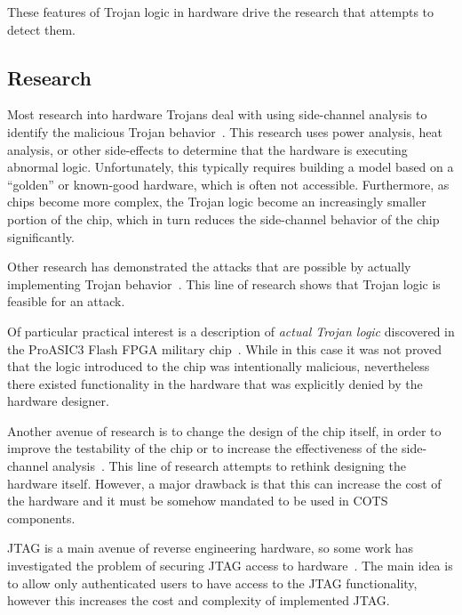 \documentclass[11pt,letterpaper]{article}
\begin{document}
These features of Trojan logic in hardware drive the research that
attempts to detect them. 

\subsection{Research}

Most research into hardware Trojans deal with using side-channel
analysis to identify the malicious Trojan behavior~\cite{lee2005,
  agrawal2007, banga2008, banga2008a, jin2008, du2010, narasimhan2011,
  narasimhan2012, cao2013, davoodi2013, dworak2013, forte2013,
  liu2013, liu2014, bao2015}. This research uses power analysis, heat
analysis, or other side-effects to determine that the hardware is
executing abnormal logic. Unfortunately, this typically requires
building a model based on a ``golden'' or known-good hardware, which
is often not accessible. Furthermore, as chips become more complex,
the Trojan logic become an increasingly smaller portion of the chip,
which in turn reduces the side-channel behavior of the chip
significantly. 

Other research has demonstrated the attacks that are possible by
actually implementing Trojan behavior~\cite{king2008, jin2010,
  sturton2011, liu2013, jin2014, zhang2014}. This line of research
shows that Trojan logic is feasible for an attack.

Of particular practical interest is a description of \emph{actual
  Trojan logic} discovered in the ProASIC3 Flash FPGA military
chip~\cite{skorobogatov2012}. While in this case it was not proved
that the logic introduced to the chip was intentionally malicious,
nevertheless there existed functionality in the hardware that was
explicitly denied by the hardware designer. 

Another avenue of research is to change the design of the chip itself,
in order to improve the testability of the chip or to increase the
effectiveness of the side-channel analysis~\cite{chakraborty2008,
  li2008, salmani2009, hicks2010, rosenfeld2011, waksman2011,
  bhunia2013, davoodi2013, rajendran2013, rolt2014}. This line of
research attempts to rethink designing the hardware itself. However, a
major drawback is that this can increase the cost of the hardware and
it must be somehow mandated to be used in COTS components. 

JTAG is a main avenue of reverse engineering hardware, so some work
has investigated the problem of securing JTAG access to
hardware~\cite{rosenfeld2010, ren2015}. The main idea is to allow only
authenticated users to have access to the JTAG functionality, however
this increases the cost and complexity of implemented JTAG. 
\end{document}
